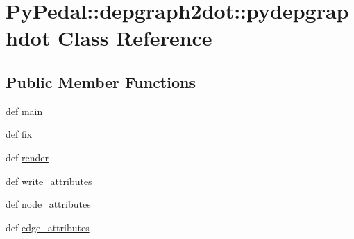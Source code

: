 \hypertarget{classPyPedal_1_1depgraph2dot_1_1pydepgraphdot}{
\section{PyPedal::depgraph2dot::pydepgraphdot Class Reference}
\label{classPyPedal_1_1depgraph2dot_1_1pydepgraphdot}
}
\subsection*{Public Member Functions}
\begin{CompactItemize}
\item 
\hypertarget{classPyPedal_1_1depgraph2dot_1_1pydepgraphdot_e169b758d9694a1027d6cfdc7ebeeba3}{
def \hyperlink{classPyPedal_1_1depgraph2dot_1_1pydepgraphdot_e169b758d9694a1027d6cfdc7ebeeba3}{main}}
\label{classPyPedal_1_1depgraph2dot_1_1pydepgraphdot_e169b758d9694a1027d6cfdc7ebeeba3}

\item 
\hypertarget{classPyPedal_1_1depgraph2dot_1_1pydepgraphdot_55cf18dd2c9a3315fdfa503cdf495561}{
def \hyperlink{classPyPedal_1_1depgraph2dot_1_1pydepgraphdot_55cf18dd2c9a3315fdfa503cdf495561}{fix}}
\label{classPyPedal_1_1depgraph2dot_1_1pydepgraphdot_55cf18dd2c9a3315fdfa503cdf495561}

\item 
\hypertarget{classPyPedal_1_1depgraph2dot_1_1pydepgraphdot_57cb5ce0c6b1a10310b7f118a3f81ccd}{
def \hyperlink{classPyPedal_1_1depgraph2dot_1_1pydepgraphdot_57cb5ce0c6b1a10310b7f118a3f81ccd}{render}}
\label{classPyPedal_1_1depgraph2dot_1_1pydepgraphdot_57cb5ce0c6b1a10310b7f118a3f81ccd}

\item 
\hypertarget{classPyPedal_1_1depgraph2dot_1_1pydepgraphdot_cb4138f78b4cd0d13576b42e5cd6e738}{
def \hyperlink{classPyPedal_1_1depgraph2dot_1_1pydepgraphdot_cb4138f78b4cd0d13576b42e5cd6e738}{write\_\-attributes}}
\label{classPyPedal_1_1depgraph2dot_1_1pydepgraphdot_cb4138f78b4cd0d13576b42e5cd6e738}

\item 
\hypertarget{classPyPedal_1_1depgraph2dot_1_1pydepgraphdot_82c8d02d232ca5690a0f332db7b4879b}{
def \hyperlink{classPyPedal_1_1depgraph2dot_1_1pydepgraphdot_82c8d02d232ca5690a0f332db7b4879b}{node\_\-attributes}}
\label{classPyPedal_1_1depgraph2dot_1_1pydepgraphdot_82c8d02d232ca5690a0f332db7b4879b}

\item 
\hypertarget{classPyPedal_1_1depgraph2dot_1_1pydepgraphdot_6c6250d159d4710ff8da5b643e368333}{
def \hyperlink{classPyPedal_1_1depgraph2dot_1_1pydepgraphdot_6c6250d159d4710ff8da5b643e368333}{edge\_\-attributes}}
\label{classPyPedal_1_1depgraph2dot_1_1pydepgraphdot_6c6250d159d4710ff8da5b643e368333}


\end{CompactItemize}
